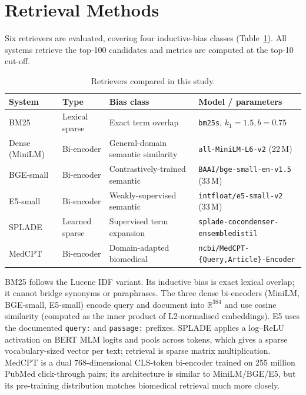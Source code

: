 \documentclass[11pt,a4paper]{article}
\begin{document}
\section{Retrieval Methods}

Six retrievers are evaluated, covering four inductive-bias classes
(Table~\ref{tab:retrievers}). All systems retrieve the top-100
candidates and metrics are computed at the top-10 cut-off.

\begin{table}[ht]
\centering
\caption{Retrievers compared in this study.}
\label{tab:retrievers}
\small
\begin{tabular}{llll}
\toprule
\textbf{System} & \textbf{Type} & \textbf{Bias class} & \textbf{Model / parameters} \\
\midrule
BM25              & Lexical sparse  & Exact term overlap                & \texttt{bm25s}, $k_1\!=\!1.5, b\!=\!0.75$ \\
Dense (MiniLM)    & Bi-encoder      & General-domain semantic similarity & \texttt{all-MiniLM-L6-v2} (22\,M) \\
BGE-small         & Bi-encoder      & Contrastively-trained semantic     & \texttt{BAAI/bge-small-en-v1.5} (33\,M) \\
E5-small          & Bi-encoder      & Weakly-supervised semantic         & \texttt{intfloat/e5-small-v2} (33\,M) \\
SPLADE            & Learned sparse  & Supervised term expansion          & \texttt{splade-cocondenser-ensembledistil} \\
MedCPT            & Bi-encoder      & Domain-adapted biomedical          & \texttt{ncbi/MedCPT-\{Query,Article\}-Encoder} \\
\bottomrule
\end{tabular}
\end{table}

BM25 follows the Lucene IDF variant. Its inductive bias is exact
lexical overlap; it cannot bridge synonyms or paraphrases. The three
dense bi-encoders (MiniLM, BGE-small, E5-small) encode query and
document into $\mathbb{R}^{384}$ and use cosine similarity (computed as
the inner product of L2-normalised embeddings). E5 uses the documented
\texttt{query:} and \texttt{passage:} prefixes. SPLADE applies a
log--ReLU activation on BERT MLM logits and pools across tokens, which
gives a sparse vocabulary-sized vector per text; retrieval is sparse
matrix multiplication. MedCPT is a dual 768-dimensional CLS-token
bi-encoder trained on 255 million PubMed click-through pairs; its
architecture is similar to MiniLM/BGE/E5, but its pre-training
distribution matches biomedical retrieval much more closely.
\end{document}
